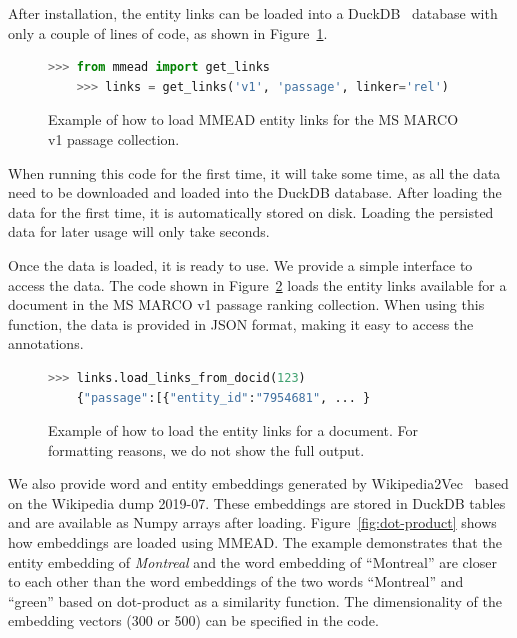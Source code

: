 \noindent After installation, the entity links can be loaded into a DuckDB~\citep{duckdb} database with only a couple of lines of code, as shown in Figure~\ref{fig:load-links}.
%
\begin{figure}[!t]
\begin{lstlisting}[language=python]
	>>> from mmead import get_links
	>>> links = get_links('v1', 'passage', linker='rel')
\end{lstlisting}
\caption{Example of how to load MMEAD entity links for the MS MARCO v1 passage collection.}
\label{fig:load-links}
\end{figure}
%
When running this code for the first time, it will take some time, as all the data need to be downloaded and loaded into the DuckDB database. After loading the data for the first time, it is automatically stored on disk. Loading the persisted data for later usage will only take seconds. 

Once the data is loaded, it is ready to use. We provide a simple interface to access the data. The code shown in Figure~\ref{fig:load-links-for-document} loads the entity links available for a document in the MS MARCO v1 passage ranking collection. When using this function, the data is provided in JSON format, making it easy to access the annotations.

\begin{figure}[!t]
\begin{lstlisting}[language=python]
	>>> links.load_links_from_docid(123)
	{"passage":[{"entity_id":"7954681", ... }
	\end{lstlisting}
	\caption{Example of how to load the entity links for a document. For formatting reasons, we do not show the full output. }
	\label{fig:load-links-for-document}
\end{figure}

We also provide word and entity embeddings generated by Wikipedia2Vec~\citep{wikipedia2vec} based on the Wikipedia dump 2019-07. These embeddings are stored in DuckDB tables and are available as Numpy arrays after loading. Figure~\ref{fig:dot-product} shows how embeddings are loaded using MMEAD. The example demonstrates that the entity embedding of \emph{Montreal} and the word embedding of ``Montreal'' are closer to each other than the word embeddings of the two words ``Montreal'' and ``green'' based on dot-product as a similarity function. The dimensionality of the embedding vectors (300 or 500) can be specified in the code.

